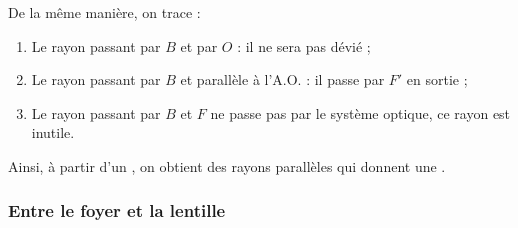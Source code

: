 \documentclass[10pt,a5paper,notitlepage]{book}
\begin{document}
De la même manière, on trace :
\begin{enumerate}
    \item Le rayon passant par $B$ et par $O$ : il ne sera pas dévié ;
    \item Le rayon passant par $B$ et parallèle à l'A.O. : il passe par $F'$ en
        sortie ;
    \item Le rayon passant par $B$ et $F$ ne passe pas par le système optique,
        ce rayon est inutile.
\end{enumerate}
Ainsi, à partir d'un , on obtient des rayons parallèles
qui donnent une .

\subsubsection{Entre le foyer et la lentille}\label{eflc}
\end{document}
